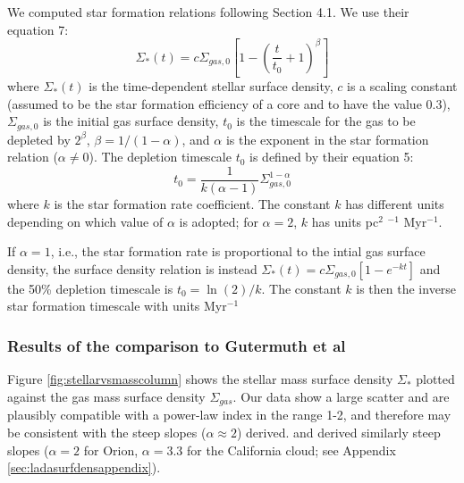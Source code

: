 \documentclass[twocolumn]{aastex61}
\begin{document}
We computed star formation relations following \citet{Gutermuth2011a} Section 4.1.
We use their equation 7:
\begin{equation}
    \label{eqn:stellarsurfdens}
    \Sigma_*(t) = c \Sigma_{gas,0} \left[1-\left(\frac{t}{t_0}+1\right)^\beta\right]
\end{equation}
where $\Sigma_*(t)$ is the time-dependent stellar surface density, $c$ is a
scaling constant (assumed to be the star formation efficiency of a core and
to have the value 0.3), $\Sigma_{gas,0}$ is the initial gas surface density,  $t_0$
is the timescale for the gas to be depleted by $2^{\beta}$, $\beta =
1/(1-\alpha)$, and $\alpha$ is
the exponent in the star formation relation ($\alpha\ne 0$).
The depletion timescale $t_0$ is defined by their equation 5:
\begin{equation}
    t_0 = \frac{1}{k(\alpha-1)} \Sigma_{gas,0}^{1-\alpha}
\end{equation}
where $k$ is the star formation rate coefficient.  The constant $k$ has
different units depending on which value of $\alpha$ is adopted;
for $\alpha=2$, $k$ has units pc$^{2}$ \msun$^{-1}$ Myr$^{-1}$.

If $\alpha=1$, i.e., the star formation rate is proportional to the intial gas
surface density, the surface density relation is instead $\Sigma_*(t) = c
\Sigma_{gas,0}[1-e^{-kt}]$ and the 50\% depletion timescale is $t_0=\ln(2)/k$.
The constant $k$ is then the inverse star formation timescale with units
Myr$^{-1}$


\subsubsection{Results of the comparison to Gutermuth et al}
\label{sec:gutermuthcomparison}



Figure \ref{fig:stellarvsmasscolumn} shows the stellar mass surface density
$\Sigma_*$ plotted against the gas mass surface density $\Sigma_{gas}$.
Our data show a large scatter and are plausibly compatible with a
power-law index in the range 1-2, and therefore may be consistent with the
steep slopes ($\alpha\approx2$) \citet{Gutermuth2011a} derived.
\citet{Lada2017a} and \citet{Lombardi2014a} derived similarly steep
slopes ($\alpha=2$ for Orion, $\alpha=3.3$ for the California cloud;
see Appendix \ref{sec:ladasurfdensappendix}).
\end{document}
